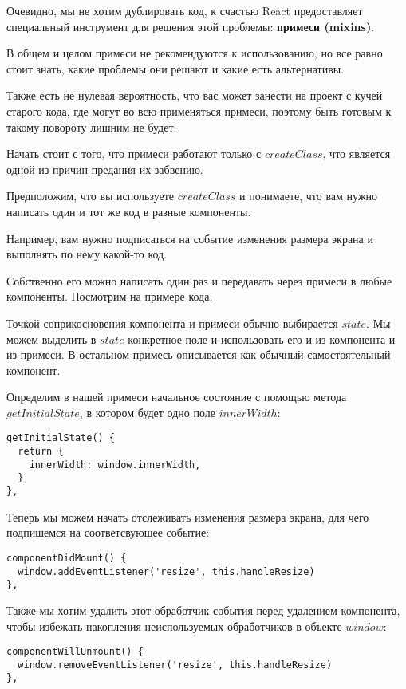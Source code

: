 Очевидно, мы не хотим дублировать код, к счастью React предоставляет специальный инструмент для решения этой проблемы: \textbf{примеси (mixins)}.

В общем и целом примеси не рекомендуются к использованию, но все равно стоит знать, какие проблемы они решают и какие есть альтернативы.

Также есть не нулевая вероятность, что вас может занести на проект с кучей старого кода, где могут во всю применяться примеси, поэтому быть готовым к такому повороту лишним не будет.

Начать стоит с того, что примеси работают только с $createClass$, что является одной из причин предания их забвению.

Предположим, что вы используете $createClass$ и понимаете, что вам нужно написать один и тот же код в разные компоненты.

Например, вам нужно подписаться на событие изменения размера экрана и выполнять по нему какой-то код.

Собственно его можно написать один раз и передавать через примеси в любые компоненты. Посмотрим на примере кода.

Точкой соприкосновения компонента и примеси обычно выбирается $state$. Мы можем выделить в $state$ конкретное поле и использовать его и из компонента и из примеси. В остальном примесь описывается как обычный самостоятельный компонент.

Определим в нашей примеси начальное состояние с помощью метода $getInitialState$, в котором будет одно поле $innerWidth$:

\begin{lstlisting}
getInitialState() {
  return {
    innerWidth: window.innerWidth,
  }
},
\end{lstlisting}

Теперь мы можем начать отслеживать изменения размера экрана, для чего подпишемся на соответсвующее событие:

\begin{lstlisting}	
componentDidMount() {
  window.addEventListener('resize', this.handleResize)
},
\end{lstlisting}

Также мы хотим удалить этот обработчик события перед удалением компонента, чтобы избежать накопления неиспользуемых обработчиков в объекте $window$:

\begin{lstlisting}
componentWillUnmount() {
  window.removeEventListener('resize', this.handleResize)
},
\end{lstlisting}

